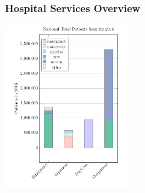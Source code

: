 









\begin{frame}
\frametitle{Hospital Services Overview}
\includegraphics[width=5.5cm]{imagesoutpatient/patienttypes2016}
{\scriptsize {}}
\end{frame}

